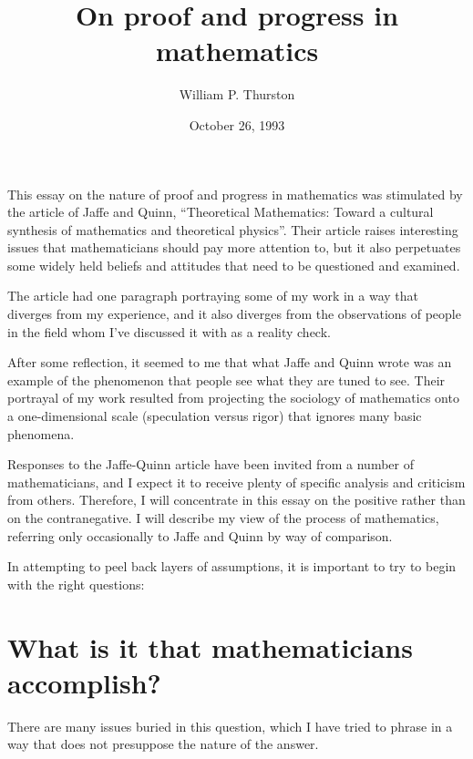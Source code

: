 \documentclass[12pt,oneside]{amsart}
\begin{document}
\def\currentvolume{30}
\def\currentissue{2}
\def\currentyear{1994}
\def\currentmonth{April}
\def\copyrightyear{1994}
\def\currentpages{161-177}
\title{On proof and progress in mathematics}
\author{William P. Thurston}
\date{October 26, 1993}
\maketitle

This essay on the nature of proof and progress in 
mathematics was 
stimulated by the article of Jaffe and Quinn, 
``Theoretical Mathematics: 
Toward a cultural synthesis of mathematics and theoretical 
physics''.
Their article raises interesting issues that 
mathematicians should pay more
attention to, but it also perpetuates some widely held
beliefs and attitudes that need to be questioned and 
examined.

The article had one paragraph portraying some of my work 
in a way
that diverges from my experience, and it also diverges 
from the observations
of people in the field whom I've discussed it with as a 
reality check.

After some reflection, it seemed to me that what Jaffe and 
Quinn
wrote was an example of the phenomenon that people see 
what they are
tuned to see. Their portrayal of my work resulted from
projecting the sociology of mathematics onto a 
one-dimensional
scale (speculation versus rigor) that ignores many basic 
phenomena.

Responses to the Jaffe-Quinn article have been invited 
from a number
of mathematicians, and I expect it to receive plenty of 
specific analysis
and criticism from others.  Therefore, I will concentrate 
in this essay
on the positive rather than on the contranegative.
I will describe my view of the process of mathematics, 
referring
only occasionally to Jaffe and Quinn by way of comparison.

\bigskip

In attempting to peel back layers of assumptions, it is 
important to
try to begin with the right questions:

\section{What is it that mathematicians accomplish?}

There are many issues buried in this question, which I 
have tried to phrase in
a way that does not presuppose the nature of the answer.
\end{document}
